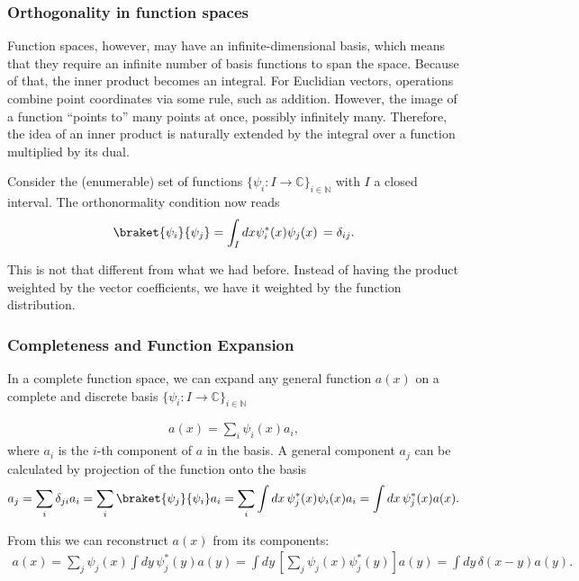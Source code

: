 \subsubsection{Orthogonality in function spaces}
Function spaces, however, may have an infinite-dimensional basis, which means that they require an infinite number of basis functions to span the space. Because of that, the inner product becomes an integral. For Euclidian vectors, operations combine point coordinates via some rule, such as addition. However, the image of a function ``points to'' many points at once, possibly infinitely many. Therefore, the idea of an inner product is naturally extended by the integral over a function multiplied by its dual.

Consider the (enumerable) set of functions $\{\psi_i:I\to \mathbb{C}\}_{i \in \mathbb{N}}$ with $I$ a closed interval.  The orthonormality condition now reads
\begin{align*}
    \braket{\psi_i}{\psi_j} =\int_I dx\psi_i^*(x)\psi_j(x)\,=\delta_{ij}.
\end{align*}

This is not that different from what we had before. Instead of having the product weighted by the vector coefficients, we have it weighted by the function distribution.

\subsubsection{Completeness and Function Expansion}
In a complete function space, we can expand any general function $a(x)$ on a complete and discrete basis $\{\psi_i:I\to \mathbb{C}\}_{i \in \mathbb{N}}$

\begin{align*}
    a(x) =  \sum_i \psi_{i}(x)a_i,
\end{align*}
where $a_i$ is the $i$-th component of $a$ in the basis. A general component $a_j$ can be calculated by projection of the function onto the basis
\begin{align*}
    a_j =  \sum_i \delta_{ji} a_i = \sum_i \braket{\psi_j}{\psi_i} a_i = \sum_i\int dx\,\psi_j^*(x) \psi_i(x) a_i = \int dx\,\psi_j^*(x) a(x).
\end{align*}

From this we can reconstruct $a(x)$ from its components:
\begin{align*}
    a(x) =  \sum_j \psi_{j}(x)\int dy\,\psi_j^*(y) a(y) =\int dy\,  \left[\sum_j \psi_{j}(x)\psi_j^*(y)\right]a(y) = \int dy\,  \delta(x - y) a(y).
\end{align*}

